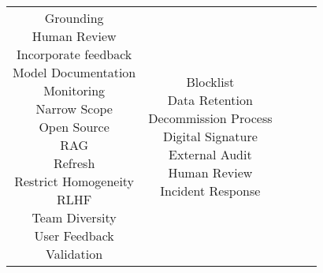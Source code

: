 \documentclass[fleqn]{article}
\begin{document}
\begin{landscape}
\begin{table}[H]
\begin{tabular}{|c|c|c|c|c|}
{			\textbullet\hspace{3pt} Grounding\\ 	
			\textbullet\hspace{3pt} Human Review \\ 	
			\textbullet\hspace{3pt} Incorporate feedback \\
			\textbullet\hspace{3pt} Model Documentation \\ 	
			\textbullet\hspace{3pt} Monitoring\\ 	
			\textbullet\hspace{3pt} Narrow Scope\\ 	
			\textbullet\hspace{3pt} Open Source\\ 	
			\textbullet\hspace{3pt} RAG\\ 	
			\textbullet\hspace{3pt} Refresh\\ 
			\textbullet\hspace{3pt} Restrict Homogeneity\\ 				
			\textbullet\hspace{3pt} RLHF\\ 
			\textbullet\hspace{3pt} Team Diversity\\ 	
			\textbullet\hspace{3pt} User Feedback\\ 	
			\textbullet\hspace{3pt} Validation\\ 					 	 
		}
		& \makecell[l]{
			\textbullet\hspace{3pt} Blocklist \\			 
			\textbullet\hspace{3pt} Data Retention\\ 	
			\textbullet\hspace{3pt} Decommission Process\\ 	
			\textbullet\hspace{3pt} Digital Signature\\ 	
			\textbullet\hspace{3pt} External Audit\\	
			\textbullet\hspace{3pt} Human Review \\ 	
			\textbullet\hspace{3pt} Incident Response\\ 	
}
\end{tabular}
\end{table}
\end{landscape}
\end{document}
